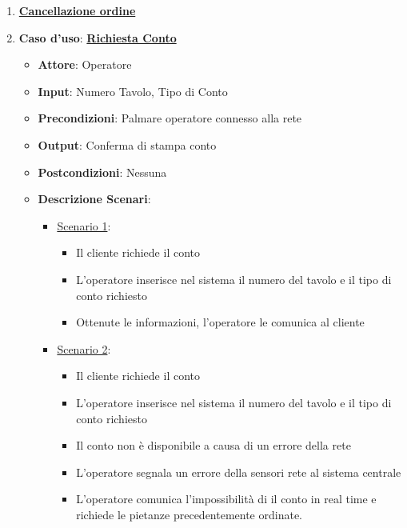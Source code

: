 \begin{enumerate}
\begin{itemize}
\begin{itemize}
\begin{itemize}
            \end{itemize}
        \end{itemize}
    \end{itemize}
    \item \uline {{\bf Cancellazione ordine}}
    \item {\bf Caso d'uso}: \uline{{\bf Richiesta Conto}}
    \begin{itemize}
        \item {\bf Attore}: Operatore
        \item {\bf Input}: Numero Tavolo, Tipo di Conto
        \item {\bf Precondizioni}: Palmare operatore connesso alla rete
        \item {\bf Output}: Conferma di stampa conto
        \item {\bf Postcondizioni}: Nessuna
        \item {\bf Descrizione Scenari}:
        \begin{itemize}
            \item \uline{Scenario 1}:
            \begin{itemize}
                \item Il cliente richiede il conto
                \item L'operatore inserisce nel sistema il numero del tavolo e il 
                    tipo di conto richiesto
                \item Ottenute le informazioni, l'operatore le comunica al cliente
            \end{itemize}
            \item \uline{Scenario 2}:
            \begin{itemize}
                \item Il cliente richiede il conto
                \item L'operatore inserisce nel sistema il numero del tavolo e il 
                    tipo di conto richiesto
                \item Il conto non \`e disponibile a causa di un errore della rete
                \item L'operatore segnala un errore della sensori rete al sistema centrale
                \item L'operatore comunica l'impossibilit\`a di il conto in real time e richiede
                    le pietanze precedentemente ordinate.
            \end{itemize}
        \end{itemize}

\end{itemize}
\end{enumerate}
